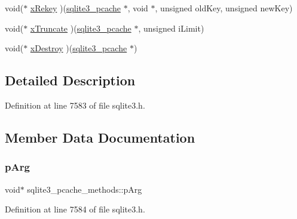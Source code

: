 \begin{DoxyCompactItemize}
\item 
void($\ast$ \mbox{\hyperlink{structsqlite3__pcache__methods_a0d8a7a980e22e908429a181f8fc7733e}{x\+Rekey}} )(\mbox{\hyperlink{sqlite3_8h_a096c453d937d51f7926d7d31c8e0bd2f}{sqlite3\+\_\+pcache}} $\ast$, void $\ast$, unsigned old\+Key, unsigned new\+Key)
\item 
void($\ast$ \mbox{\hyperlink{structsqlite3__pcache__methods_adc097defb1e83c6442fc0d47ac79cec9}{x\+Truncate}} )(\mbox{\hyperlink{sqlite3_8h_a096c453d937d51f7926d7d31c8e0bd2f}{sqlite3\+\_\+pcache}} $\ast$, unsigned i\+Limit)
\item 
void($\ast$ \mbox{\hyperlink{structsqlite3__pcache__methods_ac775533f86db1d15bf7e4ded0e037eaf}{x\+Destroy}} )(\mbox{\hyperlink{sqlite3_8h_a096c453d937d51f7926d7d31c8e0bd2f}{sqlite3\+\_\+pcache}} $\ast$)
\end{DoxyCompactItemize}


\subsection{Detailed Description}


Definition at line 7583 of file sqlite3.\+h.



\subsection{Member Data Documentation}
\mbox{\label{structsqlite3__pcache__methods_ac71a23fce5a94ac9bc6babdbbaf1b5b4}} 
\subsubsection{\texorpdfstring{p\+Arg}{pArg}}
{\footnotesize\ttfamily void$\ast$ sqlite3\+\_\+pcache\+\_\+methods\+::p\+Arg}



Definition at line 7584 of file sqlite3.\+h.

\mbox{\label{structsqlite3__pcache__methods_ac9ccbed1bea2a902906bfeaa6a330b40}} 
